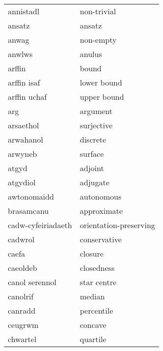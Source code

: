 \begin{supertabular}{p{0.22\textwidth}p{0.22\textwidth}}
                      annistadl &                      non-trivial \\
                         ansatz &                           ansatz \\
                          anwag &                        non-empty \\
                         anwlws &                           anulus \\
                         arffin &                            bound \\
                    arffin isaf &                      lower bound \\
                   arffin uchaf &                      upper bound \\
                            arg &                         argument \\
                      arsaethol &                       surjective \\
                      arwahanol &                         discrete \\
                        arwyneb &                          surface \\
                          atgyd &                          adjoint \\
                       atgydiol &                         adjugate \\
                    awtonomaidd &                       autonomous \\
                     brasamcanu &                      approximate \\
             cadw-cyfeiriadaeth &           orientation-preserving \\
                        cadwrol &                     conservative \\
                          caefa &                          closure \\
                       caeoldeb &                       closedness \\
                 canol serennol &                      star centre \\
                       canolrif &                           median \\
                        canradd &                       percentile \\
                        ceugrwm &                          concave \\
                       chwartel &                         quartile \\

\end{supertabular}
